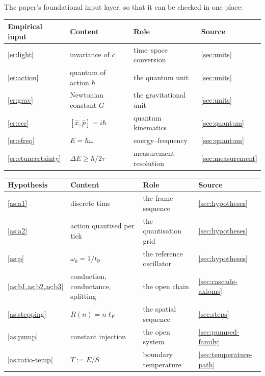 \documentclass[11pt]{amsbook}
\theoremstyle{plain}
\theoremstyle{definition}
\theoremstyle{remark}
\begin{document}
The paper's foundational input layer, so that it can be checked in one place:
\begin{center}
\begin{tabular}{@{}p{2.4cm}p{3.3cm}p{2.9cm}p{2.6cm}@{}}
\toprule
Empirical input & Content & Role & Source \\
\midrule
\cref{er:light} & invariance of $c$ & time--space conversion & \cref{sec:units} \\
\cref{er:action} & quantum of action $\hbar$ & the quantum unit & \cref{sec:units} \\
\cref{er:grav} & Newtonian constant $G$ & the gravitational unit & \cref{sec:units} \\
\cref{er:ccr} & $[\hat x, \hat p] = i\hbar$ & quantum kinematics & \cref{sec:quantum} \\
\cref{er:efreq} & $E = \hbar\omega$ & energy--frequency & \cref{sec:quantum} \\
\cref{er:etuncertainty} & $\Delta E \geq \hbar/2\tau$ & measurement resolution & \cref{sec:measurement} \\
\bottomrule
\end{tabular}
\end{center}
\begin{center}
\begin{tabular}{@{}p{2.4cm}p{3.3cm}p{2.7cm}p{2.6cm}@{}}
\toprule
Hypothesis & Content & Role & Source \\
\midrule
\cref{as:a1} & discrete time & the frame sequence & \cref{sec:hypotheses} \\
\cref{as:a2} & action quantised per tick & the quantisation grid & \cref{sec:hypotheses} \\
\cref{as:p} & $\omega_{0} = 1/t_{\mathrm P}$ & the reference oscillator & \cref{sec:hypotheses} \\
\cref{as:b1,as:b2,as:b3} & conduction, conductance, splitting & the open chain & \cref{sec:cascade-axioms} \\
\cref{as:stepping} & $R(n) = n\ell_{\mathrm P}$ & the spatial sequence & \cref{sec:steps} \\
\cref{as:pump} & constant injection & the open system & \cref{sec:pumped-family} \\
\cref{as:ratio-temp} & $T := E/S$ & boundary temperature & \cref{sec:temperature-path} \\
\bottomrule
\end{tabular}
\end{center}
\end{document}
